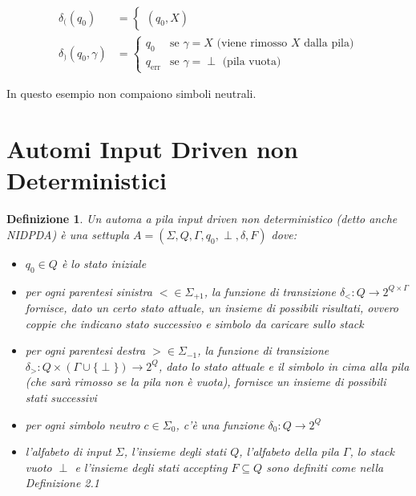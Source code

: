 \documentclass[a4paper,12pt]{report}
\newtheorem{definition}{Definizione}[chapter]
\begin{document}
    \begin{align}
        \delta_{(}(q_0) &= \begin{cases}
        (q_0, X)
        \end{cases} \\[1em]
        \delta_{)}(q_0, \gamma) &= \begin{cases}
            q_0 & \text{se } \gamma = X \text{ (viene rimosso } X \text{ dalla pila)} \\
            q_{\text{err}} & \text{se } \gamma = \perp \text{ (pila vuota)}
        \end{cases}
    \end{align}

    In questo esempio non compaiono simboli neutrali.

    \section{Automi Input Driven non Deterministici}

    \begin{definition}
        Un \textit{automa a pila input driven non deterministico} (detto anche NIDPDA) è una settupla $A = (\Sigma, Q, \Gamma, q_0, \perp, \delta, F)$ dove:
        \begin{itemize}
            \item $q_{0} \in Q$ è lo stato iniziale
            \item per ogni parentesi sinistra $< \in \Sigma_{+1}$, la funzione di transizione $\delta_{<} : Q \rightarrow 2^{Q \times \Gamma}$ fornisce, dato un certo stato attuale, un insieme di possibili risultati, ovvero coppie che indicano stato successivo e simbolo da caricare sullo stack
            \item per ogni parentesi destra $> \in \Sigma_{-1}$, la funzione di transizione $\delta_{>} : Q \times (\Gamma \cup \{\perp\}) \rightarrow 2^Q$, dato lo stato attuale e il simbolo in cima alla pila (che sarà rimosso se la pila non è vuota), fornisce un insieme di possibili stati successivi %
            \item per ogni simbolo neutro $c \in \Sigma_{0}$, c'è una funzione $\delta_{0} : Q \rightarrow 2^Q$
            \item l'alfabeto di input $\Sigma$, l'insieme degli stati $Q$, l'alfabeto della pila $\Gamma$, lo stack vuoto $\perp$ e l'insieme degli stati accepting $F \subseteq Q$ sono definiti come nella Definizione 2.1
        \end{itemize}
    \end{definition}
\end{document}
